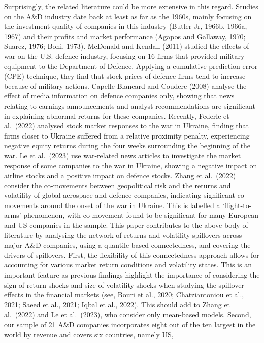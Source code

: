 \documentclass[
  letterpaper,
  DIV=11,
  numbers=noendperiod]{scrartcl}
\begin{document}
Surprisingly, the related literature could be more extensive in this
regard. Studies on the A\&D industry date back at least as far as the
1960s, mainly focusing on the investment quality of companies in this
industry (Butler Jr, 1966b, 1966a, 1967) and their profits and market
performance (Agapos and Gallaway, 1970; Suarez, 1976; Bohi, 1973).
McDonald and Kendall (2011) studied the effects of war on the U.S.
defence industry, focusing on 16 firms that provided military equipment
to the Department of Defence. Applying a cumulative prediction error
(CPE) technique, they find that stock prices of defence firms tend to
increase because of military actions. Capelle-Blancard and Couderc
(2008) analyse the effect of media information on defence companies
only, showing that news relating to earnings announcements and analyst
recommendations are significant in explaining abnormal returns for these
companies. Recently, Federle et al.~(2022) analysed stock market
responses to the war in Ukraine, finding that firms closer to Ukraine
suffered from a relative proximity penalty, experiencing negative equity
returns during the four weeks surrounding the beginning of the war. Le
et al.~(2023) use war-related news articles to investigate the market
response of some companies to the war in Ukraine, showing a negative
impact on airline stocks and a positive impact on defence stocks. Zhang
et al.~(2022) consider the co-movements between geopolitical risk and
the returns and volatility of global aerospace and defence companies,
indicating significant co-movements around the onset of the war in
Ukraine. This is labelled a `flight-to-arms' phenomenon, with
co-movement found to be significant for many European and US companies
in the sample. This paper contributes to the above body of literature by
analysing the network of returns and volatility spillovers across major
A\&D companies, using a quantile-based connectedness, and covering the
drivers of spillovers. First, the flexibility of this connectedness
approach allows for accounting for various market return conditions and
volatility states. This is an important feature as previous findings
highlight the importance of considering the sign of return shocks and
size of volatility shocks when studying the spillover effects in the
financial markets (see, Bouri et al., 2020; Chatziantoniou et al., 2021;
Saeed et al., 2021; Iqbal et al., 2022). This should add to Zhang et
al.~(2022) and Le et al.~(2023), who consider only mean-based models.
Second, our sample of 21 A\&D companies incorporates eight out of the
ten largest in the world by revenue and covers six countries, namely US,
\end{document}
